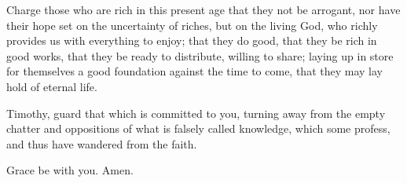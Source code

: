  Charge those who are rich in this present age that they
not be arrogant, nor have their hope set on the uncertainty of riches,
but on the living God, who richly provides us with everything to enjoy;
 that they do good, that they be rich in good works, that
they be ready to distribute, willing to share;  laying up
in store for themselves a good foundation against the time to come, that
they may lay hold of eternal life.

 Timothy, guard that which is committed to you, turning
away from the empty chatter and oppositions of what is falsely called
knowledge,  which some profess, and thus have wandered
from the faith.

Grace be with you. Amen.

